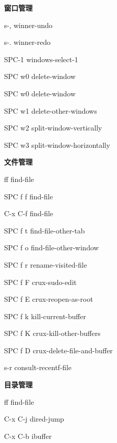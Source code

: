 \documentclass[10pt]{article}
\renewcommand\subsection[1]{\smallskip\par\textbf{\color{heading}#1}}
\begin{document}
\begin{multicols}{3}
  \subsection{窗口管理}
  \begin{keylist}
  \item[s-,] winner-undo
  \item[s-.] winner-redo
  \item[SPC-1] windows-select-1
  \item[SPC w0] delete-window
  \item[SPC w0] delete-window
  \item[SPC w1] delete-other-windows
  \item[SPC w2] split-window-vertically
  \item[SPC w3] split-window-horizontally
  \end{keylist}

  \subsection{文件管理}
  \begin{keylist}
  \item[ff] find-file
  \item[SPC f f] find-file
  \item[C-x C-f] find-file
  \item[SPC f t] find-file-other-tab
  \item[SPC f o] find-file-other-window
  \item[SPC f r] rename-visited-file
  \item[SPC f F] crux-sudo-edit
  \item[SPC f E] crux-reopen-as-root
  \item[SPC f k] kill-current-buffer
  \item[SPC f K] crux-kill-other-buffers
  \item[SPC f D] crux-delete-file-and-buffer
  \item[s-r] consult-recentf-file
  \end{keylist}

  \subsection{目录管理}
  \begin{keylist}
  \item[ff] find-file
  \item[C-x C-j] dired-jump
  \item[C-x C-b] ibuffer
  \end{keylist}


\end{multicols}
\end{document}
